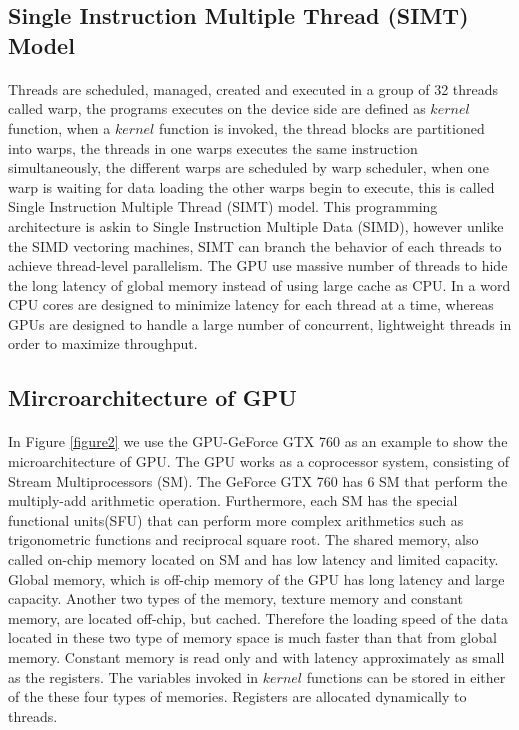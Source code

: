 \documentclass[12pt,a4paper,final]{article}
\begin{document}
\begin{spacing}{2.5}
\subsection{Single Instruction Multiple Thread (SIMT) Model} 
\paragraph{}Threads are scheduled, managed, created and executed in a group of 32 threads called warp, the programs executes on the device side are defined as $\mathit{kernel}$ function, when a $\mathit{kernel}$ function is invoked, the thread blocks are partitioned into warps, the threads in one warps executes the same instruction simultaneously, the different warps are scheduled by warp scheduler, when one warp is waiting for data loading the other warps begin to execute, this is called Single Instruction Multiple Thread (SIMT) model. This programming architecture is askin to Single Instruction Multiple Data (SIMD), however unlike the SIMD vectoring machines, SIMT can branch the behavior of each threads to achieve thread-level parallelism. The GPU use massive number of threads to hide the long latency of global memory instead of using large cache as CPU. In a word CPU cores are designed to minimize latency for each thread at a time, whereas GPUs are designed to handle a large number of concurrent, lightweight threads in order to maximize throughput.
\subsection{Mircroarchitecture of GPU} 
\paragraph{}In Figure \ref{figure2} we use the GPU-GeForce GTX 760 as an example to show the microarchitecture of  GPU. The GPU works as a coprocessor system, consisting of Stream Multiprocessors (SM). The GeForce GTX 760 has 6 SM that perform the multiply-add arithmetic operation. Furthermore, each SM has the special functional units(SFU) that can perform more complex arithmetics such as trigonometric functions and reciprocal square root. The shared memory, also called on-chip memory located on SM and has low latency and limited capacity. Global memory, which is off-chip memory of the GPU has long latency and large capacity. Another two types of the memory, texture memory and constant memory, are located off-chip, but cached. Therefore the loading speed of the data located in these two type of memory space is much faster than that from global memory. Constant memory is read only and with latency approximately as small as the registers.  The variables invoked in $\mathit{kernel}$ functions can be stored in either of the these four types of memories. Registers are allocated dynamically to threads.

\end{spacing}
\end{document}
